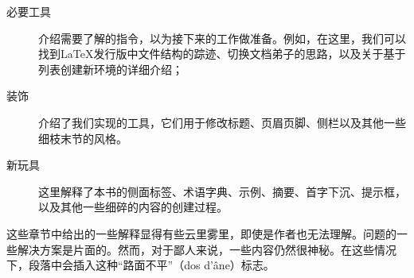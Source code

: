 \begin{description}
    \item[必要工具] 介绍需要了解的指令，以为接下来的工作做准备。例如，在这里，我们可以找到\LaTeX 发行版中文件结构的踪迹、切换文档弟子的思路，以及关于基于列表创建新环境的详细介绍；
    \item[装饰] 介绍了我们实现的工具，它们用于修改标题、页眉页脚、侧栏以及其他一些细枝末节的风格。
    \item[新玩具] 这里解释了本书的侧面标签、术语字典、示例、摘要、首字下沉、提示框，以及其他一些细碎的内容的创建过程。
\end{description}

\begin{qquestion}
这些章节中给出的一些解释显得有些云里雾里，即使是作者也无法理解。问题的一些解决方案是片面的。然而，对于鄙人来说，一些内容仍然很神秘。在这些情况下，段落中会插入这种``路面不平''（dos d'âne）标志。
\end{qquestion}
